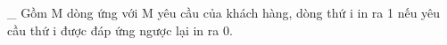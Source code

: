 \_ Gồm M dòng ứng với M yêu cầu của khách hàng, dòng thứ i in ra 1 nếu yêu cầu thứ i được đáp ứng ngược lại in ra 0.  

\